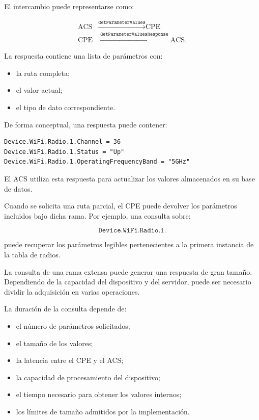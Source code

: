 El intercambio puede representarse como:

\[
\begin{aligned}
    \text{ACS}
    &\xrightarrow{\texttt{GetParameterValues}}
    \text{CPE}\\
    \text{CPE}
    &\xrightarrow{\texttt{GetParameterValuesResponse}}
    \text{ACS}.
\end{aligned}
\]

La respuesta contiene una lista de parámetros con:

\begin{itemize}
    \item la ruta completa;
    \item el valor actual;
    \item el tipo de dato correspondiente.
\end{itemize}

De forma conceptual, una respuesta puede contener:

\begin{verbatim}
Device.WiFi.Radio.1.Channel = 36
Device.WiFi.Radio.1.Status = "Up"
Device.WiFi.Radio.1.OperatingFrequencyBand = "5GHz"
\end{verbatim}

El ACS utiliza esta respuesta para actualizar los valores almacenados en
su base de datos.

Cuando se solicita una ruta parcial, el CPE puede devolver los parámetros
incluidos bajo dicha rama. Por ejemplo, una consulta sobre:

\[
    \texttt{Device.WiFi.Radio.1.}
\]

puede recuperar los parámetros legibles pertenecientes a la primera
instancia de la tabla de radios.

La consulta de una rama extensa puede generar una respuesta de gran
tamaño. Dependiendo de la capacidad del dispositivo y del servidor, puede
ser necesario dividir la adquisición en varias operaciones.

La duración de la consulta depende de:

\begin{itemize}
    \item el número de parámetros solicitados;
    \item el tamaño de los valores;
    \item la latencia entre el CPE y el ACS;
    \item la capacidad de procesamiento del dispositivo;
    \item el tiempo necesario para obtener los valores internos;
    \item los límites de tamaño admitidos por la implementación.
\end{itemize}

